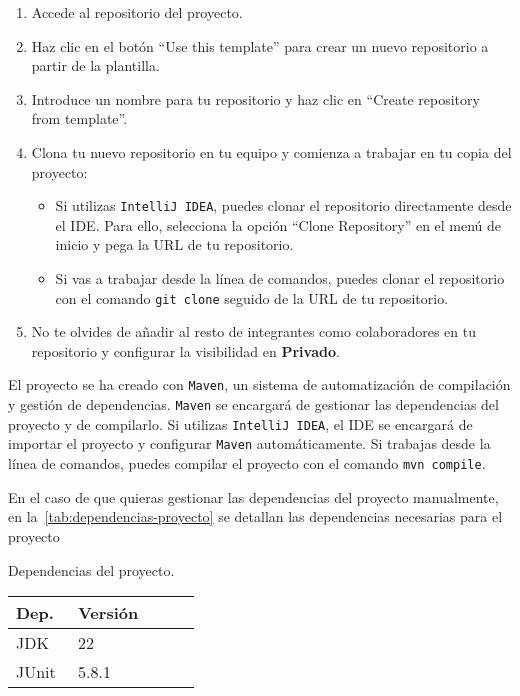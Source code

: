 \documentclass[
    a4paper, %
    12pt, %
]{CSSullivanBusinessReport}
\begin{document}
\begin{enumerate}
    \item Accede al repositorio del proyecto.
    \item Haz clic en el botón ``Use this template'' para crear un nuevo repositorio a partir de la plantilla.
    \item Introduce un nombre para tu repositorio y haz clic en ``Create repository from template''.
    \item Clona tu nuevo repositorio en tu equipo y comienza a trabajar en tu copia del proyecto:
    \begin{itemize}
        \item Si utilizas \texttt{IntelliJ IDEA}, puedes clonar el repositorio directamente desde el IDE. Para ello, selecciona la opción ``Clone Repository'' en el menú de inicio y pega la URL de tu repositorio.
        \item Si vas a trabajar desde la línea de comandos, puedes clonar el repositorio con el comando \texttt{git clone} seguido de la URL de tu repositorio.
    \end{itemize}
    \item No te olvides de añadir al resto de integrantes como colaboradores en tu repositorio y configurar la visibilidad en \textbf{Privado}.
\end{enumerate}

El proyecto se ha creado con \texttt{Maven}, un sistema de automatización de compilación y gestión de dependencias. \texttt{Maven} se encargará de gestionar las dependencias del proyecto y de compilarlo. Si utilizas \texttt{IntelliJ IDEA}, el IDE se encargará de importar el proyecto y configurar \texttt{Maven} automáticamente. Si trabajas desde la línea de comandos, puedes compilar el proyecto con el comando \texttt{mvn compile}. 

En el caso de que quieras gestionar las dependencias del proyecto manualmente, en la~\cref{tab:dependencias-proyecto} se detallan las dependencias necesarias para el proyecto

\begin{margintable}
    \footnotesize
    \caption{Dependencias del proyecto.}\label{tab:dependencias-proyecto}
    \begin{tabular}{L{0.3\linewidth} L{0.6\linewidth}}
        \toprule
        \textbf{Dep.} & \textbf{Versión} \\
        \midrule
        JDK & 22\\
        JUnit & 5.8.1\\
        \bottomrule
    \end{tabular}
\end{margintable}
\end{document}
